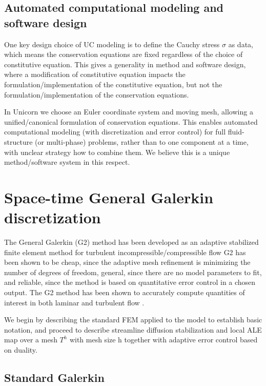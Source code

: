 \subsection{Automated computational modeling and software design}

One key design choice of UC modeling is to define the Cauchy stress
$\sigma$ as data, which means the conservation equations are fixed
regardless of the choice of constitutive equation. This gives a
generality in method and software design, where a modification of
constitutive equation impacts the formulation/implementation of the
constitutive equation, but not the formulation/implementation of the
conservation equations.

In Unicorn we choose an Euler coordinate system and moving mesh,
allowing a unified/canonical formulation of conservation
equations. This enables automated computational modeling (with
discretization and error control) for full fluid-structure (or
multi-phase) problems, rather than to one component at a time, with
unclear strategy how to combine them. We believe this is a unique
method/software system in this respect.

\section{Space-time General Galerkin discretization}

The General Galerkin (G2) method has been developed as an adaptive
stabilized finite element method for turbulent
incompressible/compressible flow
\cite{Hoffman2005,HoffmanJohnson2006b,Hoffman2006,Hoffman2009,Hoffman2006b,Nazarov2009}
G2 has been shown to be cheap, since the adaptive mesh refinement is
minimizing the number of degrees of freedom, general, since there are
no model parameters to fit, and reliable, since the method is based on
quantitative error control in a chosen output. The G2 method has been
shown to accurately compute quantities of interest in both laminar and
turbulent
flow \cite{Hoffman2005,HoffmanJohnson2006b,Hoffman2006,Hoffman2009,Hoffman2006b,HoffmanJanssonEtAl2009}.

We begin by describing the standard FEM applied to the model to
establish basic notation, and proceed to describe streamline diffusion
stabilization and local ALE map over a mesh $T^h$ with mesh size h
together with adaptive error control based on duality.

\subsection{Standard Galerkin}

